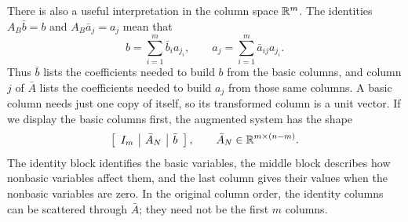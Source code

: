 \documentclass[11pt,a4paper]{article}
\begin{document}
There is also a useful interpretation in the column space $\mathbb{R}^m$.
The identities $A_B\bar b=b$ and $A_B\bar a_j=a_j$ mean that
\[
  b=\sum_{i=1}^m\bar b_i a_{j_i},\qquad
  a_j=\sum_{i=1}^m\bar a_{ij}a_{j_i}.
\]
Thus $\bar b$ lists the coefficients needed to build $b$ from the basic
columns, and column $j$ of $\bar A$ lists the coefficients needed to build
$a_j$ from those same columns. A basic column needs just one copy of itself,
so its transformed column is a unit vector. If we display the basic columns
first, the augmented system has the shape
\[
  \left[\begin{array}{c|c|c}
      I_m & \bar A_N & \bar b
    \end{array}\right],
  \qquad \bar A_N\in\mathbb{R}^{m\times(n-m)}.
\]
The identity block identifies the basic variables, the middle block describes
how nonbasic variables affect them, and the last column gives their values
when the nonbasic variables are zero. In the original column order, the
identity columns can be scattered through $\bar A$; they need not be the
first $m$ columns.
\end{document}
